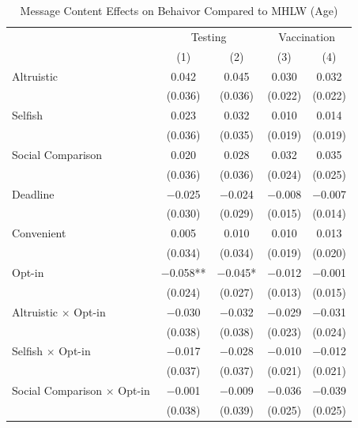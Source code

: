\documentclass[
]{article}
\begin{document}
\begin{table}

\caption{\label{tab:reg-act-woA}Message Content Effects on Behaivor Compared to MHLW (Age)}
\centering
\fontsize{9}{11}\selectfont
\begin{threeparttable}
\begin{tabular}[t]{lcccc}
\toprule
\multicolumn{1}{c}{ } & \multicolumn{2}{c}{Testing} & \multicolumn{2}{c}{Vaccination} \\
\cmidrule(l{3pt}r{3pt}){2-3} \cmidrule(l{3pt}r{3pt}){4-5}
  & (1) & (2) & (3) & (4)\\
\midrule
Altruistic & \num{0.042} & \num{0.045} & \num{0.030} & \num{0.032}\\
 & (\num{0.036}) & (\num{0.036}) & (\num{0.022}) & (\num{0.022})\\
Selfish & \num{0.023} & \num{0.032} & \num{0.010} & \num{0.014}\\
 & (\num{0.036}) & (\num{0.035}) & (\num{0.019}) & (\num{0.019})\\
Social Comparison & \num{0.020} & \num{0.028} & \num{0.032} & \num{0.035}\\
 & (\num{0.036}) & (\num{0.036}) & (\num{0.024}) & (\num{0.025})\\
Deadline & \num{-0.025} & \num{-0.024} & \num{-0.008} & \num{-0.007}\\
 & (\num{0.030}) & (\num{0.029}) & (\num{0.015}) & (\num{0.014})\\
Convenient & \num{0.005} & \num{0.010} & \num{0.010} & \num{0.013}\\
 & (\num{0.034}) & (\num{0.034}) & (\num{0.019}) & (\num{0.020})\\
Opt-in & \num{-0.058}** & \num{-0.045}* & \num{-0.012} & \num{-0.001}\\
 & (\num{0.024}) & (\num{0.027}) & (\num{0.013}) & (\num{0.015})\\
Altruistic $\times$ Opt-in & \num{-0.030} & \num{-0.032} & \num{-0.029} & \num{-0.031}\\
 & (\num{0.038}) & (\num{0.038}) & (\num{0.023}) & (\num{0.024})\\
Selfish $\times$ Opt-in & \num{-0.017} & \num{-0.028} & \num{-0.010} & \num{-0.012}\\
 & (\num{0.037}) & (\num{0.037}) & (\num{0.021}) & (\num{0.021})\\
Social Comparison $\times$ Opt-in & \num{-0.001} & \num{-0.009} & \num{-0.036} & \num{-0.039}\\
 & (\num{0.038}) & (\num{0.039}) & (\num{0.025}) & (\num{0.025})\\

\end{tabular}
\end{threeparttable}
\end{table}
\end{document}
